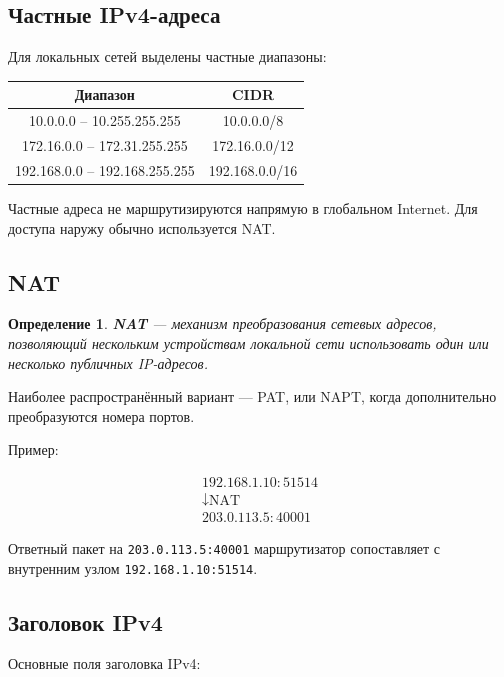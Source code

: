 \documentclass[12pt,a4paper]{article}
\newtheorem{definition}{Определение}
\begin{document}
\subsection{Частные IPv4-адреса}

Для локальных сетей выделены частные диапазоны:

\begin{center}
\begin{tabular}{|c|c|}
\hline
\textbf{Диапазон} & \textbf{CIDR} \\
\hline
10.0.0.0 -- 10.255.255.255 & 10.0.0.0/8 \\
\hline
172.16.0.0 -- 172.31.255.255 & 172.16.0.0/12 \\
\hline
192.168.0.0 -- 192.168.255.255 & 192.168.0.0/16 \\
\hline
\end{tabular}
\end{center}

Частные адреса не маршрутизируются напрямую в глобальном Internet. Для доступа наружу обычно используется NAT.

\subsection{NAT}

\begin{definition}
\textbf{NAT} --- механизм преобразования сетевых адресов, позволяющий нескольким устройствам локальной сети использовать один или несколько публичных IP-адресов.
\end{definition}

Наиболее распространённый вариант --- PAT, или NAPT, когда дополнительно преобразуются номера портов.

Пример:

\[
\begin{array}{c}
192.168.1.10:51514 \\
\downarrow \text{NAT} \\
203.0.113.5:40001
\end{array}
\]

Ответный пакет на \texttt{203.0.113.5:40001} маршрутизатор сопоставляет с внутренним узлом \texttt{192.168.1.10:51514}.

\subsection{Заголовок IPv4}

Основные поля заголовка IPv4:
\end{document}
